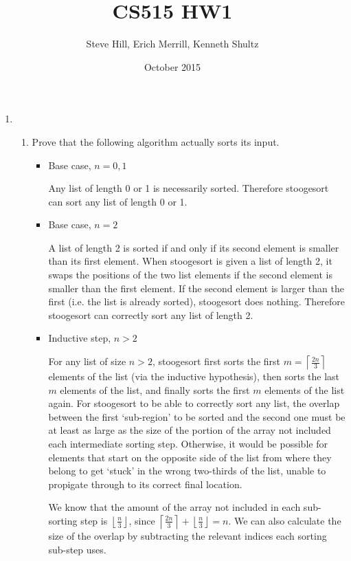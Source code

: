 \documentclass{article}
\title{CS515 HW1}
\author{Steve Hill, Erich Merrill, Kenneth Shultz}
\date{October 2015}
\newcommand{\ceil}[1]{\left\lceil#1\right\rceil}
\newcommand{\floor}[1]{\left\lfloor#1\right\rfloor}
\begin{document}
\maketitle

\begin{enumerate}
\item 
    \begin{enumerate}
    \item 
    Prove that the following algorithm actually sorts its input.

  \begin{itemize}
  \item Base case, $n=0,1$

  Any list of length 0 or 1 is necessarily sorted. Therefore stoogesort can sort any list of length 0 or 1.

  \item Base case, $n=2$

  A list of length 2 is sorted if and only if its second element is smaller than its first element. 
  When stoogesort is given a list of length 2, it swaps the positions of the two list elements if the second element is smaller than the first element. If the second element is larger than the first (i.e. the list is already sorted), stoogesort does nothing.
  Therefore stoogesort can correctly sort any list of length 2.

  \item Inductive step, $n>2$

  For any list of size $n > 2$, stoogesort first sorts the first $m=\ceil{\frac{2n}{3}}$ elements of the list (via the inductive hypothesis), then sorts the last $m$ elements of the list, and finally sorts the first $m$ elements of the list again.
  For stoogesort to be able to correctly sort any list, the overlap between the first `sub-region' to be sorted and the second one must be at least as large as the size of the portion of the array not included each intermediate sorting step.
  Otherwise, it would be possible for elements that start on the opposite side of the list from where they belong to get `stuck' in the wrong two-thirds of the list, unable to propigate through to its correct final location.

  We know that the amount of the array not included in each sub-sorting step is $\floor{\frac{n}{3}}$, since $\ceil{\frac{2n}{3}} + \floor{\frac{n}{3}} = n$. We can also calculate the size of the overlap by subtracting the relevant indices each sorting sub-step uses.


\end{itemize}
\end{enumerate}
\end{enumerate}
\end{document}
